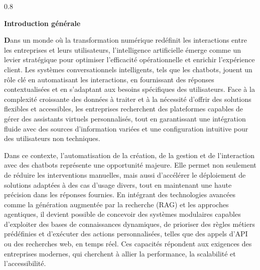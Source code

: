\newpage
{}  %
\begin{spacing}{0.8}
\end{spacing}
\begin{center}
    \LARGE \bfseries Introduction générale 
\end{center}
\vspace{30pt}
\adjustmtc
\thispagestyle{MyStyle}

{\fontsize{24}{24}\selectfont\textbf{D}}ans un monde où la transformation numérique redéfinit les interactions entre les entreprises et leurs utilisateurs, l’intelligence artificielle émerge comme un levier stratégique pour optimiser l’efficacité opérationnelle et enrichir l’expérience client. Les systèmes conversationnels intelligents, tels que les chatbots, jouent un rôle clé en automatisant les interactions, en fournissant des réponses contextualisées et en s’adaptant aux besoins spécifiques des utilisateurs. Face à la complexité croissante des données à traiter et à la nécessité d’offrir des solutions flexibles et accessibles, les entreprises recherchent des plateformes capables de gérer des assistants virtuels personnalisés, tout en garantissant une intégration fluide avec des sources d’information variées et une configuration intuitive pour des utilisateurs non techniques.

Dans ce contexte, l’automatisation de la création, de la gestion et de l’interaction avec des chatbots représente une opportunité majeure. Elle permet non seulement de réduire les interventions manuelles, mais aussi d’accélérer le déploiement de solutions adaptées à des cas d’usage divers, tout en maintenant une haute précision dans les réponses fournies. En intégrant des technologies avancées comme la génération augmentée par la recherche (RAG) et les approches agentiques, il devient possible de concevoir des systèmes modulaires capables d’exploiter des bases de connaissances dynamiques, de prioriser des règles métiers prédéfinies et d’exécuter des actions personnalisées, telles que des appels d’API ou des recherches web, en temps réel. Ces capacités répondent aux exigences des entreprises modernes, qui cherchent à allier la performance, la scalabilité et l'accessibilité.

